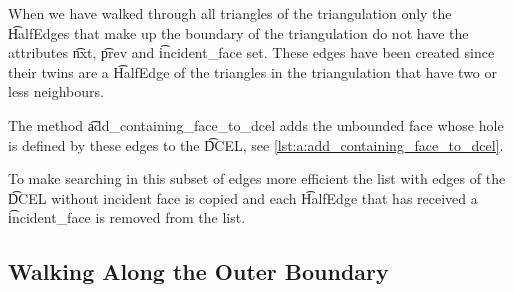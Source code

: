 	When we have walked through all triangles of the triangulation only the \t{HalfEdge}s that make up the boundary of the triangulation do not have the attributes \t{nxt}, \t{prev} and \t{incident_face} set. These edges have been created since their twins are a \t{HalfEdge} of the triangles in the triangulation that have two or less neighbours.

	The method \t{add_containing_face_to_dcel} adds the unbounded face whose hole is defined by these edges to the \t{DCEL}, see \autoref{lst:a:add_containing_face_to_dcel}. 

	

	To make searching in this subset of edges more efficient the list with edges of the \t{DCEL} without incident face is copied and each \t{HalfEdge} that has received a \t{incident_face} is removed from the list. \\

\subsection{Walking Along the Outer Boundary}

% 
